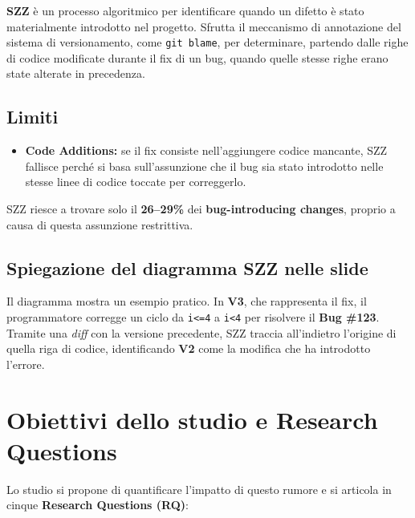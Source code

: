 \textbf{SZZ} è un processo algoritmico per identificare quando un difetto è stato materialmente introdotto nel progetto. Sfrutta il meccanismo di annotazione del sistema di versionamento, come \texttt{git blame}, per determinare, partendo dalle righe di codice modificate durante il fix di un bug, quando quelle stesse righe erano state alterate in precedenza.

\subsection{Limiti}

\begin{itemize}
    \item \textbf{Code Additions:} se il fix consiste nell'aggiungere codice mancante, SZZ fallisce perché si basa sull'assunzione che il bug sia stato introdotto nelle stesse linee di codice toccate per correggerlo.
\end{itemize}

\begin{notaslide}
SZZ riesce a trovare solo il \textbf{26--29\%} dei \textbf{bug-introducing changes}, proprio a causa di questa assunzione restrittiva.
\end{notaslide}

\subsection{Spiegazione del diagramma SZZ nelle slide}

Il diagramma mostra un esempio pratico. In \textbf{V3}, che rappresenta il fix, il programmatore corregge un ciclo da \texttt{i<=4} a \texttt{i<4} per risolvere il \textbf{Bug \#123}. Tramite una \emph{diff} con la versione precedente, SZZ traccia all'indietro l'origine di quella riga di codice, identificando \textbf{V2} come la modifica che ha introdotto l'errore.

\section{Obiettivi dello studio e Research Questions}

Lo studio si propone di quantificare l'impatto di questo rumore e si articola in cinque \textbf{Research Questions (RQ)}:

